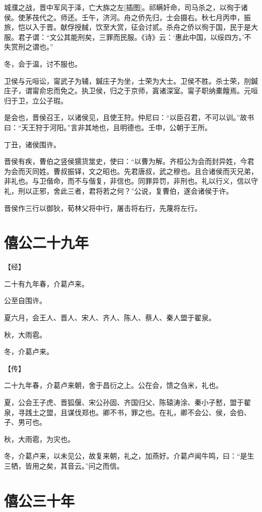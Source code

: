 \documentclass[a4paper,12pt,UTF8,twoside]{ctexbook}
\begin{document}
城濮之战，晋中军风于泽，亡大旆之左[插图]。祁瞒奸命，司马杀之，以徇于诸侯。使茅茷代之。师还。壬午，济河。舟之侨先归，士会摄右。秋七月丙申，振旅，恺以入于晋。献俘授馘，饮至大赏，征会讨贰。杀舟之侨以徇于国，民于是大服。君子谓：“文公其能刑矣，三罪而民服。《诗》云：‘惠此中国，以绥四方。’不失赏刑之谓也。”

冬，会于温，讨不服也。

卫侯与元咺讼，甯武子为辅，鍼庄子为坐，士荣为大士。卫侯不胜。杀士荣，刖鍼庄子，谓甯俞忠而免之。执卫侯，归之于京师，寘诸深室。甯子职纳橐饘焉。元咺归于卫，立公子瑕。

是会也，晋侯召王，以诸侯见，且使王狩。仲尼曰：“以臣召君，不可以训。”故书曰：“天王狩于河阳。”言非其地也，且明德也。壬申，公朝于王所。

丁丑，诸侯围许。

晋侯有疾，曹伯之竖侯獳货筮史，使曰：“以曹为解。齐桓公为会而封异姓，今君为会而灭同姓。曹叔振铎，文之昭也。先君唐叔，武之穆也。且合诸侯而灭兄弟，非礼也。与卫偕命，而不与偕复，非信也。同罪异罚，非刑也。礼以行义，信以守礼，刑以正邪，舍此三者，君将若之何？”公说，复曹伯，遂会诸侯于许。

晋侯作三行以御狄，荀林父将中行，屠击将右行，先蔑将左行。

\section{僖公二十九年}



【经】

二十有九年春，介葛卢来。

公至自围许。

夏六月，会王人、晋人、宋人、齐人、陈人、蔡人、秦人盟于翟泉。

秋，大雨雹。

冬，介葛卢来。

【传】

二十九年春，介葛卢来朝，舍于昌衍之上。公在会，馈之刍米，礼也。

夏，公会王子虎、晋狐偃、宋公孙固、齐国归父、陈辕涛涂、秦小子慭，盟于翟泉，寻践土之盟，且谋伐郑也。卿不书，罪之也。在礼，卿不会公、侯，会伯、子、男可也。

秋，大雨雹，为灾也。

冬，介葛卢来，以未见公，故复来朝，礼之，加燕好。介葛卢闻牛鸣，曰：“是生三牺，皆用之矣，其音云。”问之而信。


\section{僖公三十年}
\end{document}
